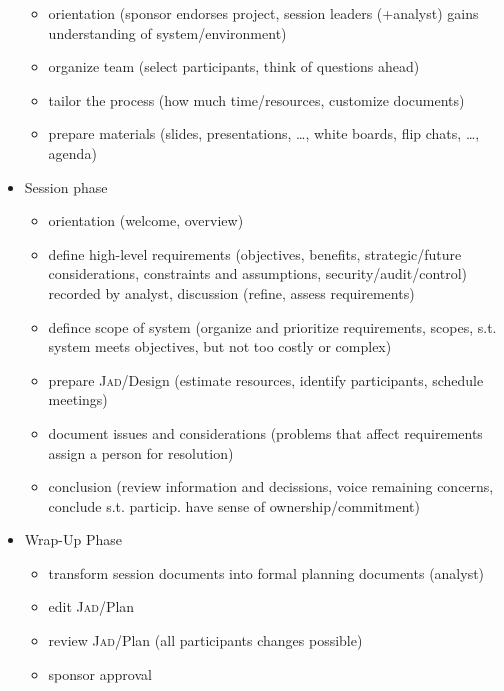 \documentclass[a4paper, 10pt]{article}
\begin{document}
\begin{itemize}
\begin{itemize}
		\item orientation (sponsor endorses project, session leaders (+analyst) gains understanding of system/environment)
		\item organize team (select participants, think of questions ahead)
		\item tailor the process (how much time/resources, customize documents)
		\item prepare materials (slides, presentations, \dots, white boards, flip chats, \dots, agenda)
	\end{itemize}
	\item Session phase
	\begin{itemize}
		\item orientation (welcome, overview)
		\item define high-level requirements (objectives, benefits, strategic/future considerations, constraints and assumptions, security/audit/control) \follows recorded by analyst, discussion (refine, assess requirements)
		\item defince scope of system (organize and prioritize requirements, scopes, s.t. system meets objectives, but not too costly or complex)
		\item prepare \textsc{Jad}/Design (estimate resources, identify participants, schedule meetings)
		\item document issues and considerations (problems that affect requirements \follows assign a person for resolution)
		\item conclusion (review information and decissions, voice remaining concerns, conclude s.t. particip. have sense of ownership/commitment)
	\end{itemize}
	\item Wrap-Up Phase
	\begin{itemize}
		\item transform session documents into formal planning documents (analyst)
		\item edit \textsc{Jad}/Plan
		\item review \textsc{Jad}/Plan (all participants \follows changes possible)
		\item sponsor approval
	\end{itemize}
\end{itemize}
\end{document}
